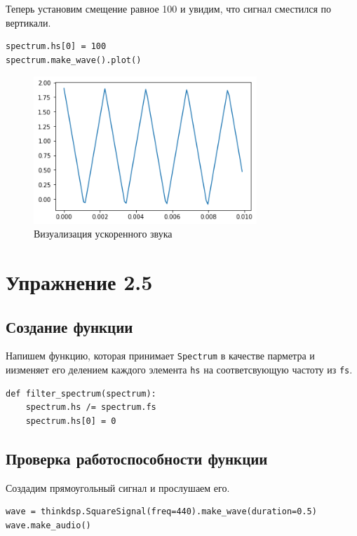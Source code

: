 \documentclass[a4paper,12pt]{report}
\begin{document}
Теперь установим смещение равное 100 и увидим, что сигнал сместился по вертикали.

\begin{lstlisting}[caption=Смещение спектра и его визуализация]
spectrum.hs[0] = 100
spectrum.make_wave().plot()
\end{lstlisting}

\begin{figure}[H]
        \centering
        \includegraphics[width=0.75\textwidth]{lab2_fig4_2.png}
        \caption{Визуализация ускоренного звука}
        \label{fig:lab2_fig4_2}
\end{figure}

\chapter{Упражнение 2.5}
\section{Создание функции}

Напишем функцию, которая принимает \texttt{Spectrum} в качестве парметра и иизменяет его делением каждого элемента \texttt{hs} на соответсвующую частоту из \texttt{fs}.

\begin{lstlisting}[caption=Создание функции]
def filter_spectrum(spectrum):
    spectrum.hs /= spectrum.fs
    spectrum.hs[0] = 0
\end{lstlisting}

\section{Проверка работоспособности функции}

Создадим прямоугольный сигнал и прослушаем его.

\begin{lstlisting}[caption=Создание сигнала и его воспроизведение]
wave = thinkdsp.SquareSignal(freq=440).make_wave(duration=0.5)
wave.make_audio()
\end{lstlisting}
\end{document}

